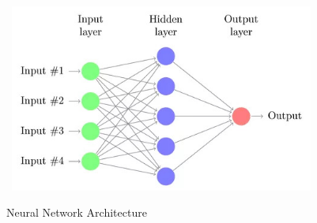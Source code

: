 \begin{figure}[H]
    \centering
    \caption{Neural Network Architecture}\vspace{0.5em}
    \label{fig:nn-example}\
    \includegraphics[width=100mm]{Figures/nn-example.jpg}

    \vspace{-1em}
\end{figure}

